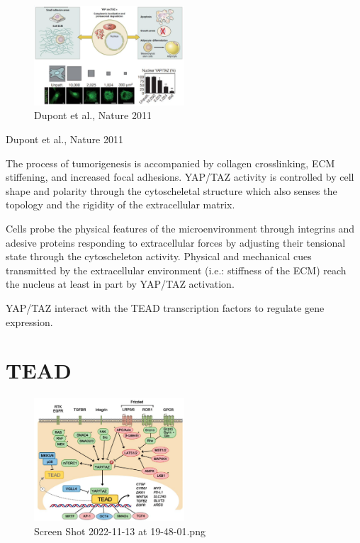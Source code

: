 \begin{figure}
\centering
\includegraphics[width=0.5\textwidth]{../_resources/Screen_Shot_2022-11-13_at_19-43-07.png}
\caption{Dupont et al., Nature 2011}
\end{figure}

Dupont et al., Nature 2011

The process of tumorigenesis is accompanied by collagen crosslinking, ECM stiffening, and increased focal adhesions. YAP/TAZ activity is controlled by cell shape and polarity through the cytoscheletal structure which also senses the topology and the rigidity of the extracellular matrix.

Cells probe the physical features of the microenvironment through integrins and adesive proteins responding to extracellular forces by adjusting their tensional state through the cytoscheleton activity. Physical and mechanical cues transmitted by the extracellular environment (i.e.: stiffness of the ECM) reach the nucleus at least in part by YAP/TAZ activation.

YAP/TAZ interact with the TEAD transcription factors to regulate gene expression.

\hypertarget{tead}{%
\section{TEAD}\label{tead}}

\begin{figure}
\centering
\includegraphics[width=0.5\textwidth]{../_resources/Screen_Shot_2022-11-13_at_19-48-01.png}
\caption{Screen Shot 2022-11-13 at 19-48-01.png}
\end{figure}

